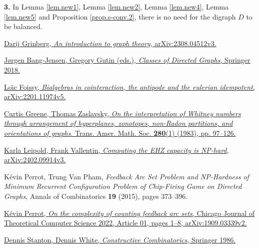 \documentclass[numbers=enddot,12pt,final,onecolumn,notitlepage]{scrartcl}%
\theoremstyle{definition}
\theoremstyle{plainsl}
\begin{document}
\bigskip

\textbf{3.} In Lemma \ref{lem.new1}, Lemma \ref{lem.new2}, Lemma
\ref{lem.new4}, Lemma \ref{lem.new5} and Proposition \ref{prop.s-conv.2},
there is no need for the digraph $D$ to be balanced.

\begin{thebibliography}{99999999}                                                                                         %


\href{https://arxiv.org/abs/2308.04512v3}{Darij Grinberg,
\textit{An introduction to graph theory}, arXiv:2308.04512v3.}

%
\href{https://doi.org/10.1007/978-3-319-71840-8}{J\o rgen Bang-Jensen, Gregory
Gutin (eds.), \textit{Classes of Directed Graphs}, Springer 2018.}

%
\href{https://arxiv.org/abs/2201.11974v5}{Lo\"{\i}c Foissy, \textit{Bialgebras
in cointeraction, the antipode and the eulerian idempotent},
arXiv:2201.11974v5.}

%
\href{https://doi.org/10.1090/S0002-9947-1983-0712251-1}{Curtis Greene, Thomas
Zaslavsky, \textit{On the interpretation of Whitney numbers through
arrangement of hyperplanes, zonotopes, non-Radon partitions, and orientations
of graphs}. Trans. Amer. Math. Soc. \textbf{280}(1) (1983), pp. 97--126.}

\href{https://arxiv.org/abs/2402.09914v3}{Karla
Leipold, Frank Vallentin, \textit{Computing the EHZ capacity is NP-hard},
arXiv:2402.09914v3.}

K\'{e}vin Perrot, Trung Van Pham, \textit{Feedback
Arc Set Problem and NP-Hardness of Minimum Recurrent Configuration Problem of
Chip-Firing Game on Directed Graphs}, Annals of Combinatorics \textbf{19}
(2015), pages 373--396.

%
\href{https://arxiv.org/abs/1909.03339v2}{K\'{e}vin Perrot, \textit{On the
complexity of counting feedback arc sets}, Chicago Journal of Theoretical
Computer Science 2022, Article 01, pages 1--8, arXiv:1909.03339v2.}

%
\href{https://doi.org/10.1007/978-1-4612-4968-9}{Dennis Stanton, Dennis White,
\textit{Constructive Combinatorics}, Springer 1986.}
\end{thebibliography}
\end{document}
